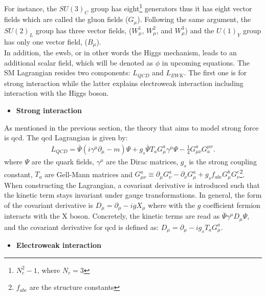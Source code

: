 For instance, the $SU(3)_C$ group has eight\footnote{$N_c^2-1$, where $N_c=3$} generators thus it has eight vector fields which are called the gluon fields ($G_{\mu}$). Following the same argument, the $SU(2)_L$  group has three vector fields, ($W_{\mu}^1$, $ W_{\mu}^2$, and $ W_{\mu}^3$) and the $U(1)_Y$ group has only one vector field, ($B_{\mu}$). \\
In addition, the \acrshort{ewsb}, or in other words the Higgs mechanism, leads to an additional scalar field, which will be denoted as $\phi$ in upcoming equations. 
The SM Lagrangian resides two components: $L_{QCD}$ and $L_{EWK}$. The first one is for strong interaction while the latter explains electroweak interaction including interaction with the Higgs boson. 
\begin{itemize}
  \item \textbf{Strong interaction}
\end{itemize}
As mentioned in the previous section, the theory that aims to model strong force is \acrshort{qcd}. The \acrshort{qcd} Lagrangian is given by:
\begin{eqnarray}
\label{LagQCD}
{L_{QCD}} = {\bar{\Psi}(i\gamma^{\mu}\partial_{\mu}-m)\Psi + g_s\bar{\Psi}T_aG_{\mu}^a\gamma^{\mu}\Psi - \frac{1}{4}G_{\mu\nu}^aG^{\mu\nu}_a}.
\end{eqnarray}
where $\Psi$ are the quark fields, $\gamma^{\mu}$ are the Dirac matrices, $g_s$ is the strong coupling constant, $T_a$ are Gell-Mann matrices and $G_{\mu\nu}^a \equiv \partial_{\mu}G_{\nu}^a - \partial_{\nu}G_{\mu}^a + g_sf_{abc}G_{\mu}^bG_{\nu}^c$\footnote{$f_{abc}$ are the structure constants}.
When constructing the Lagrangian, a covariant derivative is introduced such that the kinetic term stays invariant under gauge transformations. In general, the form of the covariant derivative is $D_{\mu}=\partial_{\mu}-igX_{\mu}$ where with the $g$ coefficient fermion interacts with the X boson. Concretely, the kinetic terms are read as $\bar{\Psi}\gamma^{\mu}D_{\mu}\Psi$, and the covariant derivative for \acrshort{qcd} is defined as: $D_{\mu}=\partial_{\mu}-ig_sT_aG_{\mu}^a$.
\begin{itemize}
  \item \textbf{Electroweak interaction}
\end{itemize}

